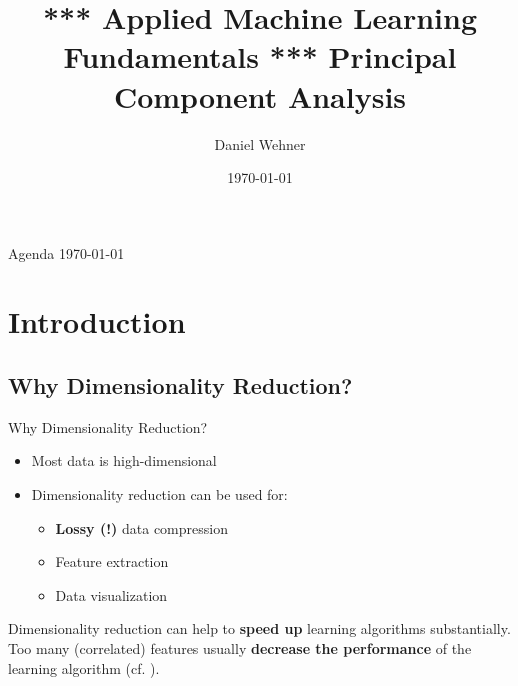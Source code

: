 


\title[Principal Component Analysis]{*** Applied Machine Learning Fundamentals *** Principal Component Analysis}
\author{Daniel Wehner}
\date{\today}




\maketitlepage


\begin{frame}{Agenda \today}
	\begin{multicols}{2}
		\tableofcontents
	\end{multicols}
\end{frame}


\section{Introduction}

\subsection{Why Dimensionality Reduction?}

\begin{frame}{Why Dimensionality Reduction?}{}
	\begin{itemize}
		\item Most data is high-dimensional
		\item Dimensionality reduction can be used for:
		\begin{itemize}
			\item \textbf{Lossy (!)} data compression
			\item Feature extraction
			\item Data visualization
		\end{itemize}
	\end{itemize}
	
	\begin{boxBlueNoFrame}
		Dimensionality reduction can help to \textbf{speed up} learning algorithms substantially.
		Too many (correlated) features usually \textbf{decrease the performance} of the learning algorithm
		(cf. ).
	\end{boxBlueNoFrame}
\end{frame}


